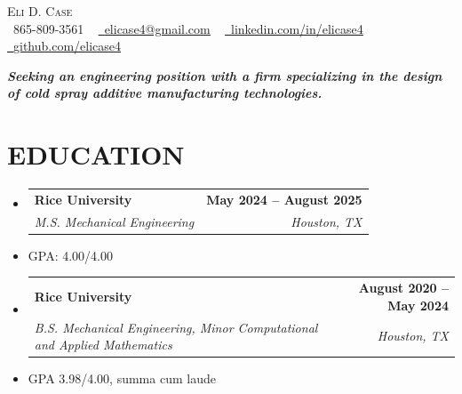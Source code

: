 \documentclass[letterpaper,11pt]{article}
\makeatletter
\newcommand{\resumeItem}[1]{
  \item \small{
    {#1 \vspace{-2pt}}
  }
}
\newcommand{\resumeSubheading}[4]{
  \vspace{-2pt}\item
    \begin{tabular*}{1.0\textwidth}[t]{l@{\extracolsep{\fill}}r}
      \textbf{#1} & \textbf{\small #2} \\
      \textit{\small#3} & \textit{\small #4} \\
    \end{tabular*}\vspace{-7pt}
}
\newcommand{\resumeSubHeadingListStart}{\begin{itemize}[leftmargin=0.0in, label={}]}
\newcommand{\resumeSubHeadingListEnd}{\end{itemize}}
\makeatother
\begin{document}
\begin{center}
    {\large \scshape Eli D. Case} \\ \vspace{1pt}
    \small \raisebox{-0.1\height}\faPhone\ 865-809-3561 ~ \href{mailto:elicase4@gmail.com}{\raisebox{-0.2\height}\faEnvelope\  \underline{elicase4@gmail.com}} ~ 
    \href{https://linkedin.com/in/elicase4}{\raisebox{-0.2\height}\faLinkedin\ \underline{linkedin.com/in/elicase4}}  ~
    \href{https://github.com/elicase4}{\raisebox{-0.2\height}\faGithub\ \underline{github.com/elicase4}}
\end{center}

\begin{center}
  \vspace{4pt}
  \textit{\textbf{Seeking an engineering position with a firm specializing in the design of cold spray additive manufacturing technologies.}}
  \vspace{-2pt}
\end{center}

\section{EDUCATION}

  \resumeSubHeadingListStart
    
    \resumeSubheading
      {Rice University}{May 2024 -- August 2025}
      {M.S. Mechanical Engineering}{Houston, TX}
      \resumeItem{GPA: 4.00/4.00}
    \resumeSubheading
      {Rice University}{August 2020 -- May 2024}
      {B.S. Mechanical Engineering, Minor Computational and Applied Mathematics}{Houston, TX}
      \resumeItem{GPA 3.98/4.00, summa cum laude}

  \resumeSubHeadingListEnd
\vspace{-16pt}

\end{document}
